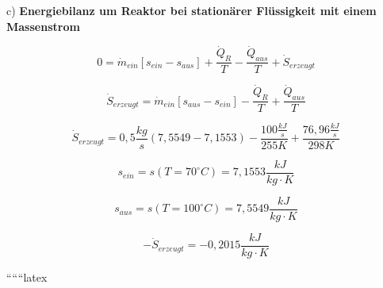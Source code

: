 c) \textbf{Energiebilanz um Reaktor bei stationärer Flüssigkeit mit einem Massenstrom}

\[
0 = \dot{m}_{ein} [s_{ein} - s_{aus}] + \frac{\dot{Q}_R}{T} - \frac{\dot{Q}_{aus}}{T} + \dot{S}_{erzeugt}
\]

\[
\dot{S}_{erzeugt} = \dot{m}_{ein} [s_{aus} - s_{ein}] - \frac{\dot{Q}_R}{T} + \frac{\dot{Q}_{aus}}{T}
\]

\[
\dot{S}_{erzeugt} = 0,5 \frac{kg}{s} (7,5549 - 7,1553) - \frac{100 \frac{kJ}{s}}{255 K} + \frac{76,96 \frac{kJ}{s}}{298 K}
\]

\[
s_{ein} = s(T=70^\circ C) = 7,1553 \frac{kJ}{kg \cdot K}
\]

\[
s_{aus} = s(T=100^\circ C) = 7,5549 \frac{kJ}{kg \cdot K}
\]

\[
-\dot{S}_{erzeugt} = -0,2015 \frac{kJ}{kg \cdot K}
\]

``````latex